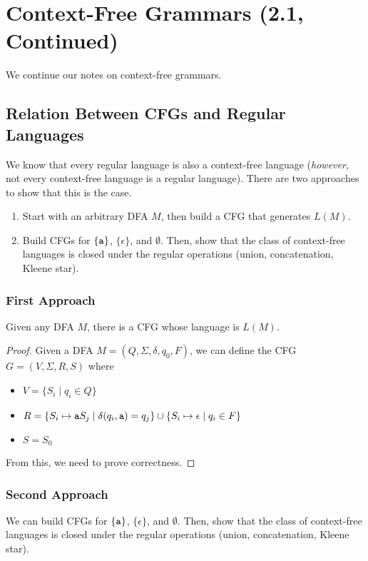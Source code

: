 \documentclass[letterpaper]{article}
\begin{document}
\section{Context-Free Grammars (2.1, Continued)}
We continue our notes on context-free grammars.

\subsection{Relation Between CFGs and Regular Languages}
We know that every regular language is also a context-free language (\emph{however}, not every context-free language is a regular language). There are two approaches to show that this is the case.
\begin{enumerate}
    \item Start with an arbitrary DFA $M$, then build a CFG that generates $L(M)$. 
    \item Build CFGs for $\{\texttt{a}\}$, $\{\epsilon\}$, and $\emptyset$. Then, show that the class of context-free languages is closed under the regular operations (union, concatenation, Kleene star). 
\end{enumerate}

\subsubsection{First Approach}
\begin{proposition}
    Given any DFA $M$, there is a CFG whose language is $L(M)$. 
\end{proposition}

\begin{mdframed}[]
    \begin{proof}
        Given a DFA $M = (Q, \Sigma, \delta, q_0, F)$, we can define the CFG $G = (V, \Sigma, R, S)$ where 
        \begin{itemize}
            \item $V = \{S_i \mid q_i \in Q\}$
            \item $R = \{S_i \mapsto \texttt{a}S_j \mid \delta(q_i, \texttt{a}) = q_j\} \cup \{S_i \mapsto \epsilon \mid q_i \in F\}$
            \item $S = S_0$
        \end{itemize}
        From this, we need to prove correctness.
    \end{proof}
\end{mdframed}

\subsubsection{Second Approach}
We can build CFGs for $\{\texttt{a}\}$, $\{\epsilon\}$, and $\emptyset$. Then, show that the class of context-free languages is closed under the regular operations (union, concatenation, Kleene star). 
\end{document}
